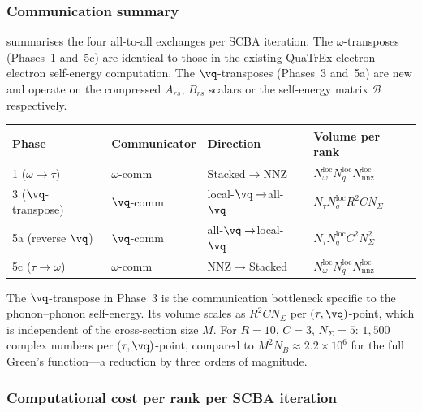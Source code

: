 \subsubsection{Communication summary}
\label{sssub:comm_summary}

 summarises the four all-to-all exchanges per
SCBA iteration.  The $\omega$-transposes (Phases~1 and~5c) are
identical to those in the existing QuaTrEx electron--electron
self-energy computation.  The $\vq$-transposes (Phases~3
and~5a) are new and operate on the compressed $A_{rs}$,
$B_{rs}$ scalars or the self-energy matrix $\mathcal{B}$
respectively.

\begin{center}
\begin{tabular}{llll}
  \toprule
  Phase & Communicator & Direction & Volume per rank \\
  \midrule
  1 ($\omega\to\tau$)
    & $\omega$-comm
    & Stacked$\to$NNZ
    & $N_\omega^{\mathrm{loc}} N_q^{\mathrm{loc}}
      N_{\mathrm{nnz}}^{\mathrm{loc}}$ \\[3pt]
  3 ($\vq$-transpose)
    & $\vq$-comm
    & local-$\vq\to$all-$\vq$
    & $N_\tau N_q^{\mathrm{loc}} R^2 C N_\Sigma$ \\[3pt]
  5a (reverse $\vq$)
    & $\vq$-comm
    & all-$\vq\to$local-$\vq$
    & $N_\tau N_q^{\mathrm{loc}} C^2 N_\Sigma^2$ \\[3pt]
  5c ($\tau\to\omega$)
    & $\omega$-comm
    & NNZ$\to$Stacked
    & $N_\omega^{\mathrm{loc}} N_q^{\mathrm{loc}}
      N_{\mathrm{nnz}}^{\mathrm{loc}}$ \\
  \bottomrule
\end{tabular}
\label{tab:comm}
\end{center}

The $\vq$-transpose in Phase~3 is the communication
bottleneck specific to the phonon--phonon self-energy.  Its
volume scales as $R^2 C N_\Sigma$ per $(\tau,\vq)$-point,
which is independent of the cross-section size $M$.  For
$R = 10$, $C = 3$, $N_\Sigma = 5$: $1{,}500$ complex numbers
per $(\tau,\vq)$-point, compared to
$M^2 N_B \approx 2.2\times 10^6$ for the full Green's
function---a reduction by three orders of magnitude.

\subsubsection{Computational cost per rank per SCBA iteration}
\label{sssub:cost_per_rank}

